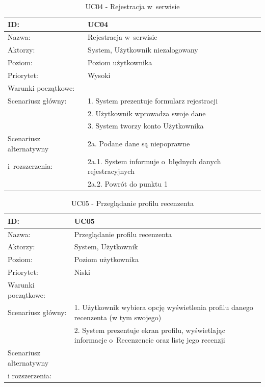 \begin{table}[H]
    \begin{tabular}{|p{5cm}|p{9cm}|}\hline
    ID: & UC04 \\\hline
    Nazwa: & Rejestracja w~serwisie \\\hline
    Aktorzy: & System, Użytkownik niezalogowany \\\hline
    Poziom: & Poziom użytkownika  \\\hline
    Priorytet: & Wysoki \\\hline
    Warunki początkowe: & ~ \\\hline
    Scenariusz główny: & 1. System prezentuje formularz rejestracji \\
    ~ & 2. Użytkownik wprowadza swoje dane \\
    ~ & 3. System tworzy konto Użytkownika \\\hline
    Scenariusz alternatywny & 2a. Podane dane są niepoprawne \\
    i~rozszerzenia: & 2a.1. System informuje o~błędnych danych rejestracyjnych \\
    ~ & 2a.2. Powrót do punktu 1 \\
    \hline\end{tabular}
	\caption{UC04 - Rejestracja w~serwisie}
\end{table}
\newpage
\begin{table}[H]
    \begin{tabular}{|p{5cm}|p{9cm}|}\hline
    ID: & UC05 \\\hline
    Nazwa: & Przeglądanie profilu recenzenta \\\hline
    Aktorzy: & System, Użytkownik \\\hline
    Poziom: & Poziom użytkownika  \\\hline
    Priorytet: & Niski \\\hline
    Warunki początkowe: & ~ \\\hline
    Scenariusz główny: & 1. Użytkownik wybiera opcję wyświetlenia profilu danego recenzenta (w tym swojego) \\
    ~ & 2. System prezentuje ekran profilu, wyświetlając informacje o~Recenzencie oraz listę jego recenzji \\\hline
    Scenariusz alternatywny & ~ \\
	i rozszerzenia: & ~ \\
    \hline\end{tabular}
	\caption{UC05 - Przeglądanie profilu recenzenta}
\end{table}

